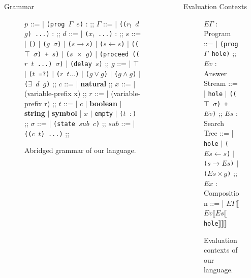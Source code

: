 \documentclass[final]{beamer}
\newlength{\sepwidth}
\newlength{\colwidth}
\newcommand{\separatorcolumn}{\begin{column}{\sepwidth}\end{column}}
\begin{document}
\begin{frame}[t]
\begin{columns}[t]
\begin{column}{\colwidth}
\begin{alertblock}{Grammar}
\centering
\begin{figure}[htbp]
\begin{bnf}
$p$ ::=
| \texttt{(prog $\Gamma$ $e$)} :
;;
$\Gamma$ ::=
| \texttt{(($r_!$ $d$ $g$) ...)} :
;;
$d$ ::=
| \texttt{($x_!$ ...)} :
;;
$s$ ::=
| \texttt{()} $\vert$ \texttt{($g$ $\sigma$)} $\vert$ \texttt{($s \rightarrow s$)} $\vert$ \texttt{($s \leftarrow s$)} 
| \texttt{(($\top$ $\sigma$) + $s$)} $\vert$ \texttt{($s$ $\times$ $g$)} 
| \texttt{(proceed (($r$ $t$ ...) $\sigma$)} 
| \texttt{(delay $s$)} 
;;
$g$ ::= 
| $\top$ $\vert$ \texttt{($t$ =?)} $\vert$ \texttt{($r$ $t ...$)}
| \texttt{($g \vee g$)} $\vert$ \texttt{($g \wedge g$)} $\vert$ \texttt{($\exists$ $d$ $g$)}
;;
$c$ ::=
| \textbf{natural}
;;
$x$ ::=
| (variable-prefix x\text{$\colon$})
;;
$r$ ::=
| (variable-prefix r\text{$\colon$})
;;
$t$ ::=
| $c$ $\vert$ \textbf{boolean} $\vert$ \textbf{string} $\vert$ \textbf{symbol}
| $x$ $\vert$ \texttt{empty} $\vert$ \texttt{($t$ $\colon$)}
;;
$\sigma$  ::=
| \texttt{(state $sub$ $c$)}
;;
$sub$ ::=
| \texttt{(($c$ $t$) ...)}
;;
\end{bnf}
\caption{Abridged grammar of our language.}
\label{fig:bnf-grammar}
\end{figure}
  
\end{alertblock}


\end{column}

\separatorcolumn

\begin{column}{\colwidth}

\begin{block}{Evaluation Contexts}
\begin{center}
\vspace{-1cm}
\begin{figure}[htbp]
\begin{bnf}
$E\Gamma$ : Program ::= 
| \texttt{(prog $\Gamma$ hole)}
;;
$Ev$ : Answer Stream ::= 
| \texttt{hole} $\vert$ \texttt{(($\top$ $\sigma$) + $Ev$)}
;;
$Es$ : Search Tree ::= 
| \texttt{hole} $\vert$ \texttt{($Es \leftarrow s$)} $\vert$ \texttt{($s \rightarrow Es$)} $\vert$ \texttt{($Es \times g$)}
;;
$Ex$ : Composition ::= 
| \texttt{$E\Gamma$$\llbracket$$Ev$$\llbracket$$Es$$\llbracket$hole$\rrbracket$$\rrbracket$$\rrbracket$}
\end{bnf}
\caption{Evaluation contexts of our language.}
\label{fig:eval-contexts}
\end{figure}
\vspace{-1.5cm}
\end{center}
\end{block}
  

\end{column}
\end{columns}
\end{frame}
\end{document}
